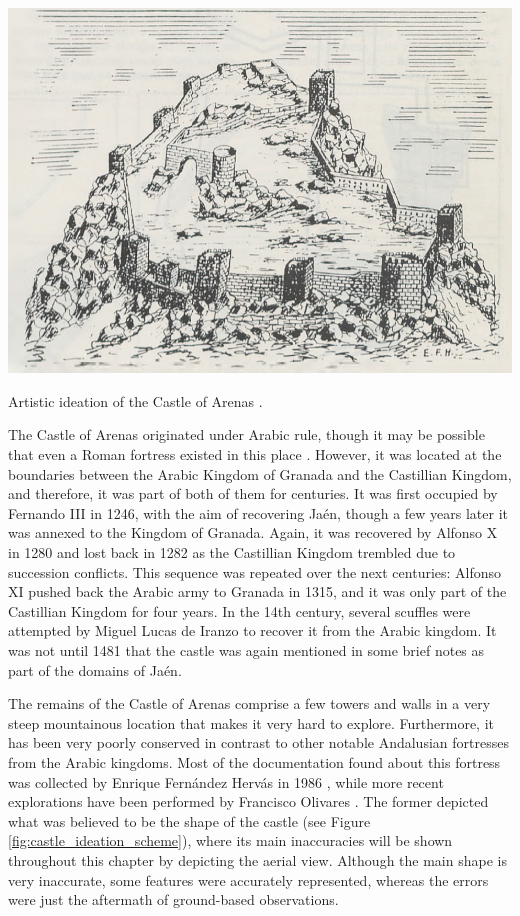 \begin{marginfigure}[-1.0cm]
    \centering
    \includegraphics[width=\linewidth]{figs/castle_puerta_arenas/castle_ideation.PNG}
    \caption{Artistic ideation of the Castle of Arenas \cite{fernandez_hervas_castillo_1986}.}
    \label{fig:castle_ideation_art}
\end{marginfigure}
The Castle of Arenas originated under Arabic rule, though it may be possible that even a Roman fortress existed in this place \cite{fernandez_hervas_castillo_1986}. However, it was located at the boundaries between the Arabic Kingdom of Granada and the Castillian Kingdom, and therefore, it was part of both of them for centuries. It was first occupied by Fernando III in 1246, with the aim of recovering Jaén, though a few years later it was annexed to the Kingdom of Granada. Again, it was recovered by Alfonso X in 1280 and lost back in 1282 as the Castillian Kingdom trembled due to succession conflicts. This sequence was repeated over the next centuries: Alfonso XI pushed back the Arabic army to Granada in 1315, and it was only part of the Castillian Kingdom for four years. In the 14th century, several scuffles were attempted by Miguel Lucas de Iranzo to recover it from the Arabic kingdom. It was not until 1481 that the castle was again mentioned in some brief notes as part of the domains of Jaén.

The remains of the Castle of Arenas comprise a few towers and walls in a very steep mountainous location that makes it very hard to explore. Furthermore, it has been very poorly conserved in contrast to other notable Andalusian fortresses from the Arabic kingdoms. Most of the documentation found about this fortress was collected by Enrique Fernández Hervás in 1986 \cite{fernandez_hervas_castillo_1986}, while more recent explorations have been performed by Francisco Olivares \cite{olivares_castillos_1992}. The former depicted what was believed to be the shape of the castle (see Figure \ref{fig:castle_ideation_scheme}), where its main inaccuracies will be shown throughout this chapter by depicting the aerial view. Although the main shape is very inaccurate, some features were accurately represented, whereas the errors were just the aftermath of ground-based observations.

